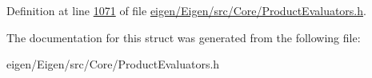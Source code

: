 Definition at line \hyperlink{eigen_2_eigen_2src_2_core_2_product_evaluators_8h_source_l01071}{1071} of file \hyperlink{eigen_2_eigen_2src_2_core_2_product_evaluators_8h_source}{eigen/\+Eigen/src/\+Core/\+Product\+Evaluators.\+h}.



The documentation for this struct was generated from the following file\+:\begin{DoxyCompactItemize}
\item 
eigen/\+Eigen/src/\+Core/\+Product\+Evaluators.\+h\end{DoxyCompactItemize}
